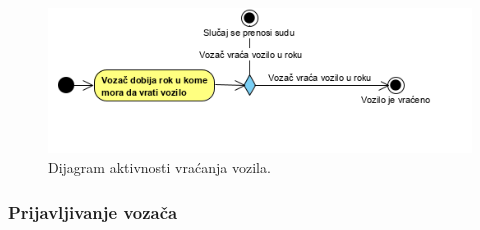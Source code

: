 \begin{figure}[H]
\begin{center}
\includegraphics[scale=1]{Slike/VracanjeVozila.png}
\end{center}
    \caption{Dijagram aktivnosti vraćanja vozila.}
\label{fig:VracanjeVozila}
\end{figure}

\subsubsection{\bfseries Prijavljivanje vozača}

